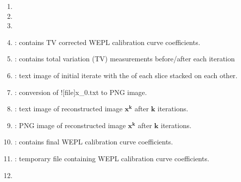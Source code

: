 \begin{tcbenvironment}
\begin{tcbparagraph}
\begin{enumerate}
	\item {}
	\item {}
	\item {}
	\item {} : contains TV corrected WEPL calibration curve coefficients.
	\item {} : contains total variation (TV) measurements before/after each iteration
	\item {} : text image of initial iterate with the \xyplane* of each slice stacked on each other.
 	\item {} : conversion of \docentry![file]{x\_0.txt} to PNG image.
	\item {} : text image of reconstructed image $\boldsymbol{x^k}$ after $\boldsymbol{k}$ iterations.
	\item {} : PNG image of reconstructed image $\boldsymbol{x^k}$ after $\boldsymbol{k}$ iterations.
	\item {} : contains final WEPL calibration curve coefficients.
	\item {} : temporary file containing WEPL calibration curve coefficients.
	\item {}	
\end{enumerate}
\end{tcbparagraph}
\end{tcbenvironment}
\endinput 